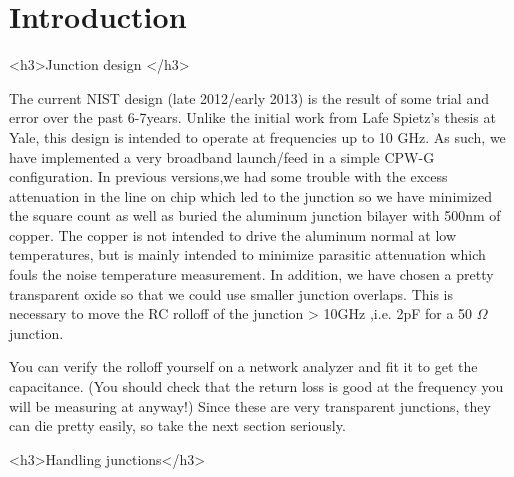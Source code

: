 \documentclass[11pt]{article}
\begin{document}
\section{
Introduction}

<h3>Junction design </h3>



The current NIST design (late 2012/early 2013) is the result of some trial and error over the past 6-7years. Unlike the initial work from Lafe Spietz’s thesis at Yale, this design is intended to operate at frequencies up to 10 GHz. As such, we have implemented a very broadband launch/feed in a simple CPW-G conﬁguration. In previous versions,we had some trouble with the excess attenuation in the line on chip which led to the junction so we have minimized the square count as well as buried the aluminum junction bilayer with 500nm of copper. The copper is not intended to drive the aluminum normal at low temperatures, but is mainly intended to minimize parasitic attenuation which fouls the noise temperature measurement. In addition, we have chosen a pretty transparent oxide so that we could use smaller junction overlaps. This is necessary to move the RC rolloff of the junction > 10GHz ,i.e. 2pF for a 50 $\Omega$ junction.




    
You can verify the rolloff yourself on a network analyzer and ﬁt it to get the capacitance. (You should check that the return loss is good at the frequency you will be measuring at anyway!) Since these are very transparent junctions, they can die pretty easily, so take the next section seriously.





<h3>Handling junctions</h3>
\end{document}
